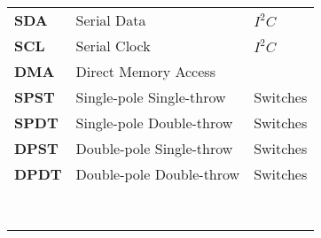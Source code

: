 \begin{tabular}{>{\bfseries}lll}
    SDA     & Serial Data       & $ I^2C $\\
    SCL     & Serial Clock      & $ I^2C $\\
    DMA     & Direct Memory Access& \\
    SPST    & Single-pole Single-throw & Switches \\
    SPDT    & Single-pole Double-throw & Switches \\
    DPST    & Double-pole Single-throw & Switches \\
    DPDT    & Double-pole Double-throw & Switches \\ 
    & & \\
    & & \\
    & & \\
    & & \\
    & & \\ 
    & & \\
    & & \\
    & & \\
    
\end{tabular}
